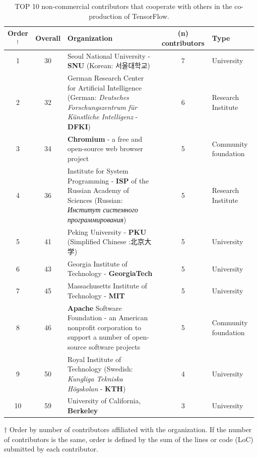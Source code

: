 \documentclass[CHICAGO,Times1COL]{WileyNJDv5} %
\begin{document}
\begin{table}[h]
 \caption{TOP 10 non-commercial contributors that cooperate with others in the co-production of TensorFlow\label{tnoncomercial}.}
\begin{tabularx}{1.0\textwidth}[]{ccp{9cm}cl}
\toprule 
Order$^\dagger$ &  Overall & Organization & (n) contributors & Type\\
\midrule 
1 & 30 & Seoul National University - \textbf{SNU} (Korean: 서울대학교)  & 7  & University  \\
2 & 32 & German Research Center for Artificial Intelligence (German: \textit{Deutsches Forschungszentrum für Künstliche Intelligenz} - \textbf{DFKI})    & 6  & Research Institute \\
3 & 34 & \textbf{Chromium} - a free and open-source web browser project &  5 & Community  foundation \\ 
4 & 36 & Institute for System Programming - \textbf{ISP} of the Russian Academy of Sciences (Russian: \textit{Институт системного программирования})  & 5 & Research Institute \\
5 & 41 &  Peking University - \textbf{PKU} (Simplified Chinese :北京大学) &  5 & University \\
6 & 43 & Georgia Institute of Technology - \textbf{GeorgiaTech} & 5 &  University\\
7 & 45 & Massachusetts Institute of Technology - \textbf{MIT} & 5 & University \\
8 & 46 & \textbf{Apache} Software Foundation - an American nonprofit corporation to support a number of open-source software projects  & 5 & Community foundation \\  
9 & 50 & Royal Institute of Technology (Swedish: \textit{Kungliga Tekniska Högskolan} - \textbf{KTH}) & 4 & University \\
10 & 59 & University of California, \textbf{Berkeley} & 3 & University\\ 

\bottomrule\end{tabularx}
\begin{tablenotes}
\item {$\dagger$  Order by number of contributors affiliated with the organization. If the number of contributors is the same, order is defined by the sum of the lines or code (LoC) submitted by each contributor.}
\end{tablenotes}


\end{table}
\end{document}
